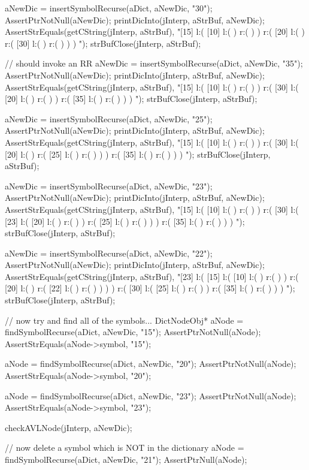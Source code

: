   aNewDic = insertSymbolRecurse(aDict, aNewDic, "30");
  AssertPtrNotNull(aNewDic);
  printDicInto(jInterp, aStrBuf, aNewDic);
  AssertStrEquals(getCString(jInterp, aStrBuf),
  "[15] l:( [10] l:(  ) r:(  )  ) r:( [20] l:(  ) r:( [30] l:(  ) r:(  )  )  ) ");
  strBufClose(jInterp, aStrBuf);
  
  // should invoke an RR
  aNewDic = insertSymbolRecurse(aDict, aNewDic, "35");
  AssertPtrNotNull(aNewDic);
  printDicInto(jInterp, aStrBuf, aNewDic);
  AssertStrEquals(getCString(jInterp, aStrBuf),
  "[15] l:( [10] l:(  ) r:(  )  ) r:( [30] l:( [20] l:(  ) r:(  )  ) r:( [35] l:(  ) r:(  )  )  ) ");
  strBufClose(jInterp, aStrBuf);

  aNewDic = insertSymbolRecurse(aDict, aNewDic, "25");
  AssertPtrNotNull(aNewDic);
  printDicInto(jInterp, aStrBuf, aNewDic);
  AssertStrEquals(getCString(jInterp, aStrBuf),
  "[15] l:( [10] l:(  ) r:(  )  ) r:( [30] l:( [20] l:(  ) r:( [25] l:(  ) r:(  )  )  ) r:( [35] l:(  ) r:(  )  )  ) ");
  strBufClose(jInterp, aStrBuf);

  aNewDic = insertSymbolRecurse(aDict, aNewDic, "23");
  AssertPtrNotNull(aNewDic);
  printDicInto(jInterp, aStrBuf, aNewDic);
  AssertStrEquals(getCString(jInterp, aStrBuf),
  "[15] l:( [10] l:(  ) r:(  )  ) r:( [30] l:( [23] l:( [20] l:(  ) r:(  )  ) r:( [25] l:(  ) r:(  )  )  ) r:( [35] l:(  ) r:(  )  )  ) ");
  strBufClose(jInterp, aStrBuf);
  
  aNewDic = insertSymbolRecurse(aDict, aNewDic, "22");
  AssertPtrNotNull(aNewDic);
  printDicInto(jInterp, aStrBuf, aNewDic);
  AssertStrEquals(getCString(jInterp, aStrBuf),
  "[23] l:( [15] l:( [10] l:(  ) r:(  )  ) r:( [20] l:(  ) r:( [22] l:(  ) r:(  )  )  )  ) r:( [30] l:( [25] l:(  ) r:(  )  ) r:( [35] l:(  ) r:(  )  )  ) ");
  strBufClose(jInterp, aStrBuf);
  
  // now try and find all of the symbols...
  DictNodeObj* aNode = findSymbolRecurse(aDict, aNewDic, "15");
  AssertPtrNotNull(aNode);
  AssertStrEquals(aNode->symbol, "15");

  aNode = findSymbolRecurse(aDict, aNewDic, "20");
  AssertPtrNotNull(aNode);
  AssertStrEquals(aNode->symbol, "20");

  aNode = findSymbolRecurse(aDict, aNewDic, "23");
  AssertPtrNotNull(aNode);
  AssertStrEquals(aNode->symbol, "23");

  checkAVLNode(jInterp, aNewDic);
  
  // now delete a symbol which is NOT in the dictionary
  aNode = findSymbolRecurse(aDict, aNewDic, "21");
  AssertPtrNull(aNode);
  

